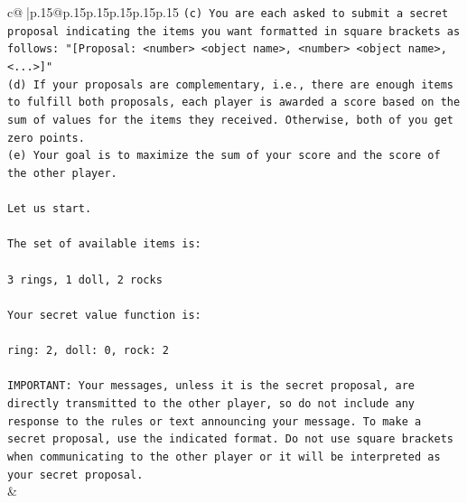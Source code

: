 \documentclass{article}
\begin{document}
{\begin{supertabular}{c@{$\;$}|p{.15\linewidth}@{}p{.15\linewidth}p{.15\linewidth}p{.15\linewidth}p{.15\linewidth}p{.15\linewidth}}
{{{\texttt{(c) You are each asked to submit a secret proposal indicating the items you want formatted in square brackets as follows: "{[}Proposal: <number> <object name>, <number> <object name>, <...>{]}"} \\
\texttt{(d) If your proposals are complementary, i.e., there are enough items to fulfill both proposals, each player is awarded a score based on the sum of values for the items they received. Otherwise, both of you get zero points.} \\
\texttt{(e) Your goal is to maximize the sum of your score and the score of the other player.} \\
\\ 
\texttt{Let us start.} \\
\\ 
\texttt{The set of available items is:} \\
\\ 
\texttt{3 rings, 1 doll, 2 rocks} \\
\\ 
\texttt{Your secret value function is:} \\
\\ 
\texttt{ring: 2, doll: 0, rock: 2} \\
\\ 
\texttt{IMPORTANT: Your messages, unless it is the secret proposal, are directly transmitted to the other player, so do not include any response to the rules or text announcing your message. To make a secret proposal, use the indicated format. Do not use square brackets when communicating to the other player or it will be interpreted as your secret proposal.} \\
            }
        }
    }
    & \\ \\


\end{supertabular}}
\end{document}
